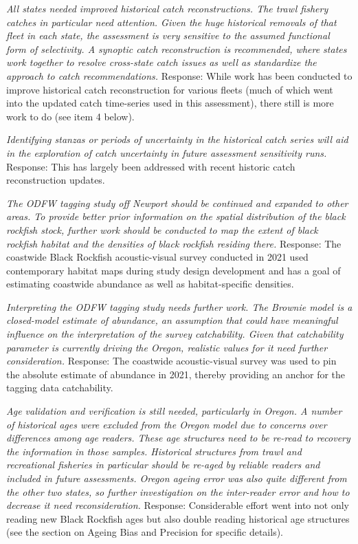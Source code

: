 \documentclass[11pt,
  letterpaper,
]{article}
\begin{document}
\textit{All states needed improved historical catch reconstructions. The trawl fishery catches in particular need attention. Given the huge historical removals of that fleet in each state, the assessment is very sensitive to the assumed functional form of selectivity. A synoptic catch reconstruction is recommended, where states work together to resolve cross-state catch issues as well as standardize the approach to catch recommendations.} Response: While work has been conducted to improve historical catch reconstruction for various fleets (much of which went into the updated catch time-series used in this assessment), there still is more work to do (see item 4 below).

\textit{Identifying stanzas or periods of uncertainty in the historical catch series will aid in the exploration of catch uncertainty in future assessment sensitivity runs.} Response: This has largely been addressed with recent historic catch reconstruction updates.

\textit{The ODFW tagging study off Newport should be continued and expanded to other areas. To provide better prior information on the spatial distribution of the black rockfish stock, further work should be conducted to map the extent of black rockfish habitat and the densities of black rockfish residing there.} Response: The coastwide Black Rockfish acoustic-visual survey conducted in 2021 used contemporary habitat maps during study design development and has a goal of estimating coastwide abundance as well as habitat-specific densities.

\textit{Interpreting the ODFW tagging study needs further work. The Brownie model is a closed-model estimate of abundance, an assumption that could have meaningful influence on the interpretation of the survey catchability. Given that catchability parameter is currently driving the Oregon, realistic values for it need further consideration.} Response: The coastwide acoustic-visual survey was used to pin the absolute estimate of abundance in 2021, thereby providing an anchor for the tagging data catchability.

\textit{Age validation and verification is still needed, particularly in Oregon. A number of historical ages were excluded from the Oregon model due to concerns over differences among age readers. These age structures need to be re-read to recovery the information in those samples. Historical structures from trawl and recreational fisheries in particular should be re-aged by reliable readers and included in future assessments. Oregon ageing error was also quite different from the other two states, so further investigation on the inter-reader error and how to decrease it need reconsideration.} Response: Considerable effort went into not only reading new Black Rockfish ages but also double reading historical age structures (see the section on Ageing Bias and Precision for specific details).
\end{document}
